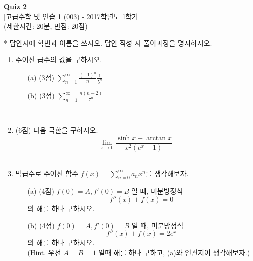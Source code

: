 \documentclass{article}
\begin{document}
\begin{center}
\textbf{Quiz 2}\\
{[고급수학 및 연습 1 (003) - 2017학년도 1학기]}\\
(제한시간: 20분, 만점: 20점)\\
\end{center}

* 답안지에 학번과 이름을 쓰시오. 답안 작성 시 풀이과정을 명시하시오.

\begin{enumerate}
\item 주어진 급수의 값을 구하시오.
	\begin{enumerate}
		\item[(a)] (3점) $\displaystyle \sum_{n=1}^\infty \frac{(-1)^n}{n} \frac{1}{5^n}$
		\item[(b)] (3점) $\displaystyle \sum_{n=1}^\infty \frac{n(n-2)}{7^n}$
	\end{enumerate}
~
\item (6점) 다음 극한을 구하시오.
	$$\lim_{x\rightarrow 0} \frac{\sinh{x} - \arctan{x}}{x^2(e^x-1)}$$
~\\

\item 멱급수로 주어진 함수 $f(x) = \displaystyle \sum_{n=0}^\infty a_nx^n$를 생각해보자.
	\begin{enumerate}
		\item[(a)] (4점) $f(0)=A, f'(0)=B$ 일 때, 미분방정식 $$f''(x)+f(x)=0$$의 해를 하나 구하시오.
		\item[(b)] (4점) $f(0)=A, f'(0)=B$ 일 때, 미분방정식 $$f''(x)+f(x)=2e^x$$의 해를 하나 구하시오.\\ (Hint. 우선 $A=B=1$ 일때 해를 하나 구하고, (a)와 연관지어 생각해보자.)
	\end{enumerate}


\end{enumerate}
\end{document}
